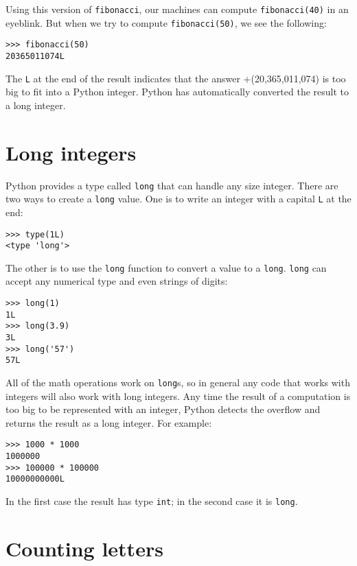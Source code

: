 Using this version of {\tt fibonacci}, our machines can compute
{\tt fibonacci(40)} in an eyeblink.  But when we try to compute
{\tt fibonacci(50)}, we see the following:

\beforeverb
\begin{verbatim}
>>> fibonacci(50)
20365011074L
\end{verbatim}
\afterverb
%
The {\tt L} at the end of the result indicates that the answer
+(20,365,011,074) is too big to fit into a Python integer.  Python
has automatically converted the result to a long integer.

\section{Long integers}

Python provides a type called {\tt long} that can handle any size
integer.  There are two ways to create a {\tt long} value.  One is
to write an integer with a capital {\tt L} at the end:

\beforeverb
\begin{verbatim}
>>> type(1L)
<type 'long'>
\end{verbatim}
\afterverb
%
The other is to use the {\tt long} function to convert a value to a
{\tt long}.  {\tt long} can accept any numerical type and even
strings of digits:


\beforeverb
\begin{verbatim}
>>> long(1)
1L
>>> long(3.9)
3L
>>> long('57')
57L
\end{verbatim}
\afterverb
%
All of the math operations work on {\tt long}s, so in general
any code that works with integers will also work with long
integers.  Any time the result of a computation is too big
to be represented with an integer, Python detects the overflow
and returns the result as a long integer.  For example:

\beforeverb
\begin{verbatim}
>>> 1000 * 1000
1000000
>>> 100000 * 100000
10000000000L
\end{verbatim}
\afterverb
%
In the first case the result has type {\tt int}; in the
second case it is {\tt long}.


\section{Counting letters}

